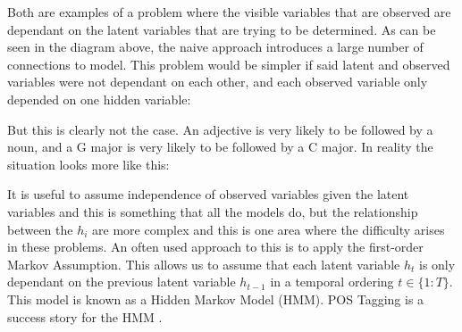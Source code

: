 \documentclass[bsc,singlespacing,logo, parskip, deptreport]{infthesis}
\begin{document}
Both are examples of a problem where the visible variables that are observed are dependant on the latent variables that are trying to be determined. As can be seen in the diagram above, the naive approach introduces a large number of connections to model.  This problem would be simpler if said latent and observed variables were not dependant on each other, and each observed variable only depended on one hidden variable:

\begin{center}
\end{center}

But this is clearly not the case. An adjective is very likely to be followed by a noun, and a G major is very likely to be followed by a C major. In reality the situation looks more like this:

\begin{center}
\end{center}

It is useful to assume independence of observed variables given the latent variables and this is something that all the models do, but the relationship between the $h_i$ are more complex and this is one area where the difficulty arises in these problems. An often used approach to this is to apply the first-order Markov Assumption. This allows us to assume that each latent variable $h_t$ is only dependant on the previous latent variable $h_{t-1}$ in a temporal ordering $t \in \{1:T\}$. This model is known as a Hidden Markov Model (HMM). POS Tagging is a success story for the HMM \cite{kupiec1992robust}. 
\end{document}
